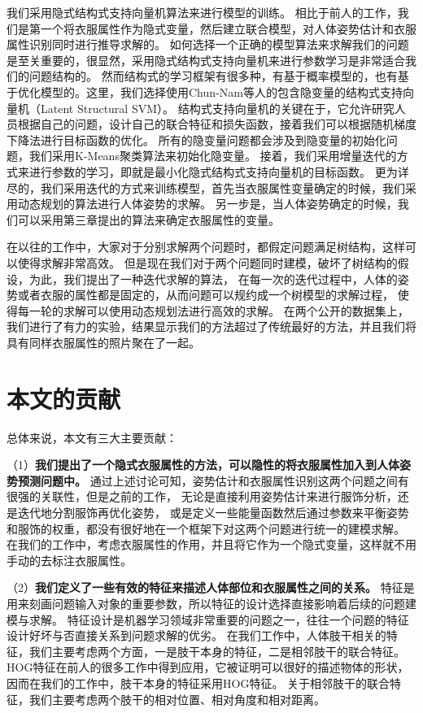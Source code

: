 我们采用隐式结构式支持向量机算法来进行模型的训练。
相比于前人的工作，我们是第一个将衣服属性作为隐式变量，然后建立联合模型，对人体姿势估计和衣服属性识别同时进行推导求解的。 如何选择一个正确的模型算法来求解我们的问题是至关重要的，很显然，采用隐式结构式支持向量机来进行参数学习是非常适合我们的问题结构的。 然而结构式的学习框架有很多种，有基于概率模型的，也有基于优化模型的。这里，我们选择使用Chun-Nam等人的包含隐变量的结构式支持向量机（Latent Structural SVM）。 结构式支持向量机的关键在于，它允许研究人员根据自己的问题，设计自己的联合特征和损失函数，接着我们可以根据随机梯度下降法进行目标函数的优化。
所有的隐变量问题都会涉及到隐变量的初始化问题，我们采用K-Means聚类算法来初始化隐变量。
接着，我们采用增量迭代的方式来进行参数的学习，即就是最小化隐式结构式支持向量机的目标函数。
更为详尽的，我们采用迭代的方式来训练模型，首先当衣服属性变量确定的时候，我们采用动态规划的算法进行人体姿势的求解。
另一步是，当人体姿势确定的时候，我们可以采用第三章提出的算法来确定衣服属性的变量。

在以往的工作中，大家对于分别求解两个问题时，都假定问题满足树结构，这样可以使得求解非常高效。 但是现在我们对于两个问题同时建模，破坏了树结构的假设，为此，我们提出了一种迭代求解的算法， 在每一次的迭代过程中，人体的姿势或者衣服的属性都是固定的，从而问题可以规约成一个树模型的求解过程， 使得每一轮的求解可以使用动态规划法进行高效的求解。
在两个公开的数据集上，我们进行了有力的实验，结果显示我们的方法超过了传统最好的方法，并且我们将具有同样衣服属性的照片聚在了一起。

\section{本文的贡献}
总体来说，本文有三大主要贡献：

（1）\textbf{我们提出了一个隐式衣服属性的方法，可以隐性的将衣服属性加入到人体姿势预测问题中。}
通过上述讨论可知，姿势估计和衣服属性识别这两个问题之间有很强的关联性，但是之前的工作，
无论是直接利用姿势估计来进行服饰分析，还是迭代地分割服饰再优化姿势，
或是定义一些能量函数然后通过参数来平衡姿势和服饰的权重，都没有很好地在一个框架下对这两个问题进行统一的建模求解。
在我们的工作中，考虑衣服属性的作用，并且将它作为一个隐式变量，这样就不用手动的去标注衣服属性。

（2）\textbf{我们定义了一些有效的特征来描述人体部位和衣服属性之间的关系。}
特征是用来刻画问题输入对象的重要参数，所以特征的设计选择直接影响着后续的问题建模与求解。 特征设计是机器学习领域非常重要的问题之一，往往一个问题的特征设计好坏与否直接关系到问题求解的优劣。
在我们工作中，人体肢干相关的特征，我们主要考虑两个方面，一是肢干本身的特征，二是相邻肢干的联合特征。 HOG特征在前人的很多工作中得到应用，它被证明可以很好的描述物体的形状，因而在我们的工作中，肢干本身的特征采用HOG特征。 关于相邻肢干的联合特征，我们主要考虑两个肢干的相对位置、相对角度和相对距离。


